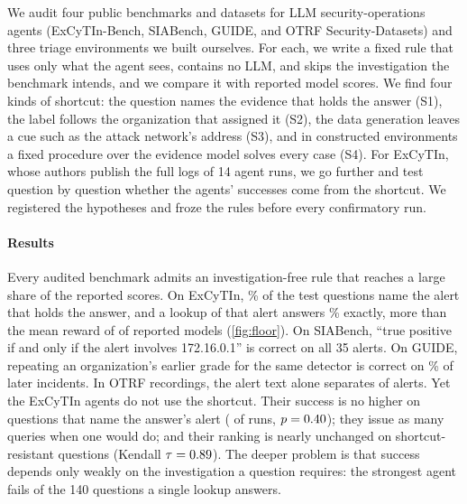 We audit four public benchmarks and datasets for LLM security-operations agents (ExCyTIn-Bench, SIABench, GUIDE, and OTRF Security-Datasets) and three triage environments we built ourselves. For each, we write a fixed rule that uses only what the agent sees, contains no LLM, and skips the investigation the benchmark intends, and we compare it with reported model scores. We find four kinds of shortcut: the question names the evidence that holds the answer (S1), the label follows the organization that assigned it (S2), the data generation leaves a cue such as the attack network's address (S3), and in constructed environments a fixed procedure over the evidence model solves every case (S4). For ExCyTIn, whose authors publish the full logs of 14 agent runs, we go further and test question by question whether the agents' successes come from the shortcut. We registered the hypotheses and froze the rules before every confirmatory run.

\paragraph{Results} Every audited benchmark admits an investigation-free rule that reaches a large share of the reported scores. On ExCyTIn, \oNamed\% of the test questions name the alert that holds the answer, and a lookup of that alert answers \oGraph\% exactly, more than the mean reward of \oBelowGraph{} of \oModels{} reported models (\cref{fig:floor}). On SIABench, ``true positive if and only if the alert involves 172.16.0.1'' is correct on all 35 alerts. On GUIDE, repeating an organization's earlier grade for the same detector is correct on \gHistPct\% of later incidents. In OTRF recordings, the alert text alone separates \otRuleCorrect{} of \otN{} alerts. Yet the ExCyTIn agents do not use the shortcut. Their success is no higher on questions that name the answer's alert (\lgPos{} of \lgModels{} runs, $p=0.40$); they issue as many queries when one would do; and their ranking is nearly unchanged on shortcut-resistant questions (Kendall $\tau=0.89$). The deeper problem is that success depends only weakly on the investigation a question requires: the strongest agent fails \tcOpusFail{} of the 140 questions a single lookup answers.

